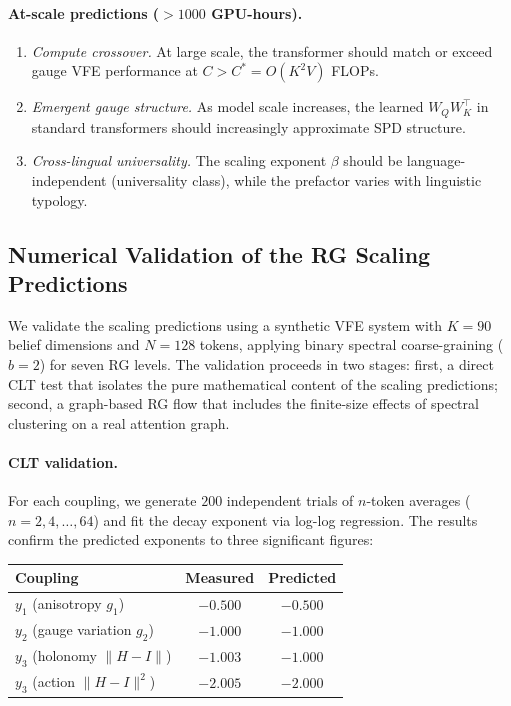 \documentclass[twoside,11pt]{article}
\begin{document}
\paragraph{At-scale predictions ($>1000$ GPU-hours).}
\begin{enumerate}
\item \emph{Compute crossover.} At large scale, the transformer should match or exceed gauge VFE performance at $C > C^* = O(K^2 V)$ FLOPs.
\item \emph{Emergent gauge structure.} As model scale increases, the learned $W_Q W_K^\top$ in standard transformers should increasingly approximate SPD structure.
\item \emph{Cross-lingual universality.} The scaling exponent $\beta$ should be language-independent (universality class), while the prefactor varies with linguistic typology.
\end{enumerate}

\subsection{Numerical Validation of the RG Scaling Predictions}
\label{sec:rg_numerical_supp}

We validate the scaling predictions using a synthetic VFE system with $K = 90$ belief dimensions and $N = 128$ tokens, applying binary spectral coarse-graining ($b = 2$) for seven RG levels. The validation proceeds in two stages: first, a direct CLT test that isolates the pure mathematical content of the scaling predictions; second, a graph-based RG flow that includes the finite-size effects of spectral clustering on a real attention graph.

\paragraph{CLT validation.}
For each coupling, we generate $200$ independent trials of $n$-token averages ($n = 2, 4, \ldots, 64$) and fit the decay exponent via log-log regression. The results confirm the predicted exponents to three significant figures:
\begin{center}
\begin{tabular}{lcc}
\toprule
\textbf{Coupling} & \textbf{Measured} & \textbf{Predicted} \\
\midrule
$y_1$ (anisotropy $g_1$) & $-0.500$ & $-0.500$ \\
$y_2$ (gauge variation $g_2$) & $-1.000$ & $-1.000$ \\
$y_3$ (holonomy $\|H - I\|$) & $-1.003$ & $-1.000$ \\
$y_3$ (action $\|H - I\|^2$) & $-2.005$ & $-2.000$ \\
\bottomrule
\end{tabular}
\end{center}
\end{document}
